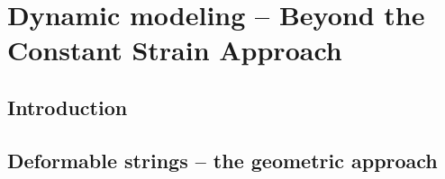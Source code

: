 \chapter[Dynamic modeling of soft robots -- Beyond PCC]{Dynamic modeling -- Beyond the Constant Strain Approach}
\label{chap: chapter 3}




\section{Introduction} \label{sec:chap1_introduction}


\section{Deformable strings -- the geometric approach} \label{sec:chap1_introduction}

